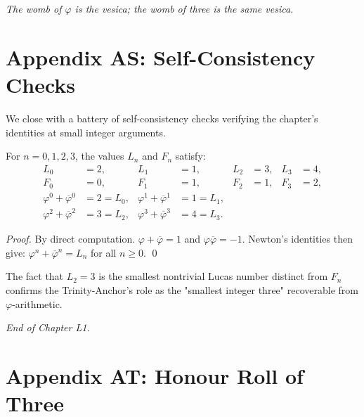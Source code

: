 \bigskip
\centerline{\textit{The womb of $\varphi$ is the vesica; the womb of three is the same vesica.}}
\bigskip


\section*{Appendix AS: Self-Consistency Checks}
\label{fa_01:sec:01-app-AS}

We close with a battery of self-consistency checks verifying the
chapter's identities at small integer arguments.

\begin{lemma}\label{fa_01:lem:01-small-n}
For $n = 0, 1, 2, 3$, the values $L_n$ and $F_n$ satisfy:
\begin{align*}
  L_0 &= 2, & L_1 &= 1, & L_2 &= 3, & L_3 &= 4, \\
  F_0 &= 0, & F_1 &= 1, & F_2 &= 1, & F_3 &= 2, \\
  \varphi^0 + \overline\varphi^0 &= 2 = L_0, & \varphi^1 +
  \overline\varphi^1 &= 1 = L_1, \\
  \varphi^2 + \overline\varphi^2 &= 3 = L_2, & \varphi^3 +
  \overline\varphi^3 &= 4 = L_3.
\end{align*}
\end{lemma}

\begin{proof}
By direct computation. $\varphi + \overline\varphi = 1$ and
$\varphi \overline\varphi = -1$. Newton's identities then give:
$\varphi^n + \overline\varphi^n = L_n$ for all $n \ge 0$.
\qed
\end{proof}

\begin{remark}
The fact that $L_2 = 3$ is the smallest nontrivial Lucas number
distinct from $F_n$ confirms the Trinity-Anchor's role as the
"smallest integer three" recoverable from $\varphi$-arithmetic.
\end{remark}

\bigskip
\centerline{\textit{End of Chapter L1.}}
\bigskip

\section*{Appendix AT: Honour Roll of Three}
\label{fa_01:sec:01-app-AT}


